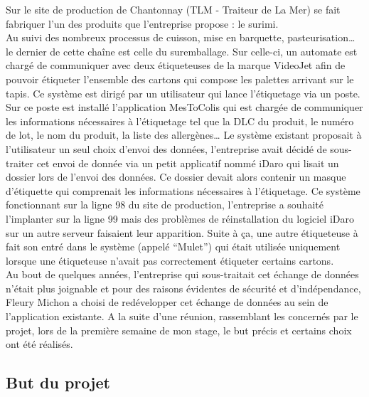 \documentclass[a4paper,12pt]{extarticle}
\begin{document}
	Sur le site de production de Chantonnay (TLM - Traiteur de La Mer) se fait fabriquer l’un des produits que l’entreprise propose : le surimi.\\
Au suivi des nombreux processus de cuisson, mise en barquette, pasteurisation… le dernier de cette chaîne est celle du suremballage. Sur celle-ci, un automate est chargé de communiquer avec deux étiqueteuses de la marque VideoJet afin de pouvoir étiqueter l’ensemble des cartons qui compose les palettes arrivant sur le tapis. Ce système est dirigé par un utilisateur qui lance l’étiquetage via un poste.\\
Sur ce poste est installé l’application MesToColis qui est chargée de communiquer les informations nécessaires à l’étiquetage tel que la DLC du produit, le numéro de lot, le nom du produit, la liste des allergènes… Le système existant proposait à l’utilisateur un seul choix d’envoi des données, l’entreprise avait décidé de sous-traiter cet envoi de donnée via un petit applicatif nommé iDaro qui lisait un dossier lors de l’envoi des données. Ce dossier devait alors contenir un masque d’étiquette qui comprenait les informations nécessaires à l’étiquetage. Ce système fonctionnant sur la ligne 98 du site de production, l’entreprise a souhaité l’implanter sur la ligne 99 mais des problèmes de réinstallation du logiciel iDaro sur un autre serveur faisaient leur apparition. Suite à ça, une autre étiqueteuse à fait son entré dans le système (appelé “Mulet”) qui était utilisée uniquement lorsque une étiqueteuse n’avait pas correctement étiqueter certains cartons.\\
Au bout de quelques années, l’entreprise qui sous-traitait cet échange de données n’était plus joignable et pour des raisons évidentes de sécurité et d’indépendance, Fleury Michon a choisi de redévelopper cet échange de données au sein de l’application existante. A la suite d’une réunion, rassemblant les concernés par le projet, lors de la première semaine de mon stage, le but précis et certains choix ont été réalisés.\\
	
	\subsection{But du projet}
		\paragraph{}
			
\end{document}
